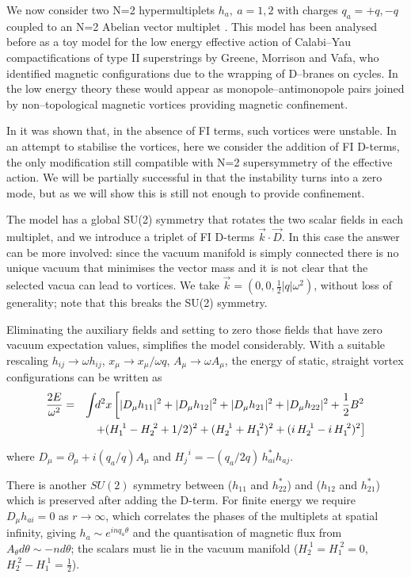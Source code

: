 \documentclass[a4paper,aps,prd,superscriptaddress,floats]{revtex4}
\begin{document}
We now consider two N=2 hypermultiplets $h_a, \ a=1,2$ with charges
$q_a = +q,-q$ coupled to an N=2 Abelian vector multiplet \cite{ADH98}.
This model has been analysed before as a toy model for the low energy
effective action of Calabi--Yau compactifications of type II
superstrings by Greene, Morrison and Vafa\cite{GMV96}, who identified
magnetic configurations due to the wrapping of D--branes on cycles.
In the low energy theory these would appear as monopole--antimonopole
pairs joined by non--topological magnetic vortices providing magnetic
confinement.

In \cite{ADH98} it was shown that, in the absence of FI terms, such
vortices were unstable. In an attempt to stabilise the vortices, here
we consider the addition of FI D-terms, the only modification still
compatible with N=2 supersymmetry of the effective action.  We will be
partially successful in that the instability turns into a zero mode,
but as we will show this is still not enough to provide confinement.

The model has a global SU(2) symmetry that rotates the two scalar
fields in each multiplet, and we introduce a triplet of FI D-terms
$\vec{k}\cdot \vec{D}$. In this case the answer can be more involved:
since the vacuum manifold is simply connected there is no unique
vacuum that minimises the vector mass and it is not clear that the
selected vacua can lead to vortices.  We take $\vec k = (0,0,\frac12
|q|\omega^2)$, without loss of generality; note that this breaks the
SU(2) symmetry.

Eliminating the auxiliary fields and setting to zero 
those fields that have zero vacuum expectation values, simplifies the
model considerably. With a suitable rescaling
$h_{ij}\to \omega h_{ij}$, $x_{\mu}\to {x_{\mu}}/{\omega q}$, 
$A_{\mu}\to\omega A_{\mu}$, 
the energy of static, straight vortex configurations can be written as
\begin{eqnarray}
{{2E}\over{\omega^2}} & = & \int\!\! d^2x\left[|D_\mu h_{11}|^2 +
     |D_\mu h_{12}|^2 + |D_\mu h_{21}|^2  +|D_\mu h_{22}|^2 +\frac12 B^2 \right. \nonumber \\
     & &\left. 
       +(H^{\;1}_1-H^{\;2}_2 + 1/2)^2
         + (H^{\;1}_2 + H^{\;2}_1)^2+ (i\,H^{\;1}_2 - i\,H^{\;2}_1)^2 \right] 
\label{model}
\end{eqnarray}

where $D_{\mu} = \partial_\mu + {i (q_a/q)} A_\mu$ and 
$H^{\;\;i}_j = - ({q_a}/{2q})\,h_{ai}^*h_{aj} $.

There is another $SU(2)$ symmetry between ($h_{11}$ and $h_{22}^*$) 
and ($h_{12}$ and $h_{21}^*$) which is preserved after adding the D-term.
For finite energy we require $D_\mu h_{ai} = 0 $ as $r \to \infty$, 
which correlates the phases of the multiplets at spatial infinity, 
giving $h_a \sim e^{inq_a \theta}$ and the quantisation of magnetic flux
from $A_\theta d\theta\sim -n d\theta$; 
the scalars must lie in the vacuum manifold 
($H^{\;1}_2 = H^{\;2}_1 = 0$, $H^{\;2}_2-H^{\;1}_1 =\frac12$). 
\end{document}
